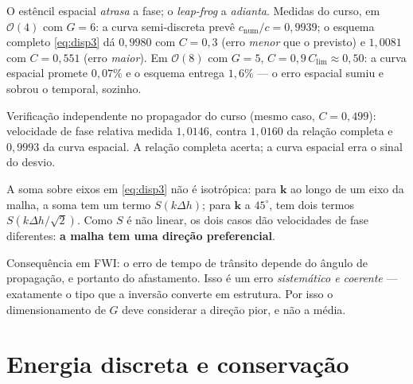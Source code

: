 \documentclass[11pt,a4paper,oneside]{report}
\begin{document}
\begin{armadilha}
O est\^encil espacial \emph{atrasa} a fase; o \emph{leap-frog} a
\emph{adianta}. Medidas do curso, em $\mathcal{O}(4)$ com $G=6$: a curva
semi-discreta prev\^e $c_{\text{num}}/c = 0{,}9939$; o esquema completo
\eqref{eq:disp3} d\'a $0{,}9980$ com $C=0{,}3$ (erro \emph{menor} que o
previsto) e $1{,}0081$ com $C=0{,}551$ (erro \emph{maior}). Em
$\mathcal{O}(8)$ com $G=5$, $C = 0{,}9\,C_{\lim} \approx 0{,}50$: a curva
espacial promete $0{,}07\%$ e o
esquema entrega $1{,}6\%$ --- o erro espacial sumiu e sobrou o temporal,
sozinho.

Verifica\c{c}\~ao independente no propagador do curso (mesmo caso,
$C = 0{,}499$): velocidade de fase relativa medida $1{,}0146$, contra $1{,}0160$ da rela\c{c}\~ao completa e
$0{,}9993$ da curva espacial. A rela\c{c}\~ao completa acerta; a curva
espacial erra o sinal do desvio.
\end{armadilha}

\begin{teoria}
A soma sobre eixos em \eqref{eq:disp3} n\~ao \'e isotr\'opica: para
$\mathbf{k}$ ao longo de um eixo da malha, a soma tem um termo
$S(k\Delta h)$; para $\mathbf{k}$ a $45^\circ$, tem dois termos
$S(k\Delta h/\sqrt 2)$. Como $S$ \'e n\~ao linear, os dois casos d\~ao
velocidades de fase diferentes: \textbf{a malha tem uma dire\c{c}\~ao
preferencial}.

Consequ\^encia em FWI: o erro de tempo de tr\^ansito depende do \^angulo de
propaga\c{c}\~ao, e portanto do afastamento. Isso \'e um erro
\emph{sistem\'atico e coerente} --- exatamente o tipo que a invers\~ao
converte em estrutura. Por isso o dimensionamento de $G$ deve considerar a
dire\c{c}\~ao pior, e n\~ao a m\'edia.
\end{teoria}

\section{Energia discreta e conserva\c{c}\~ao}
\end{document}
